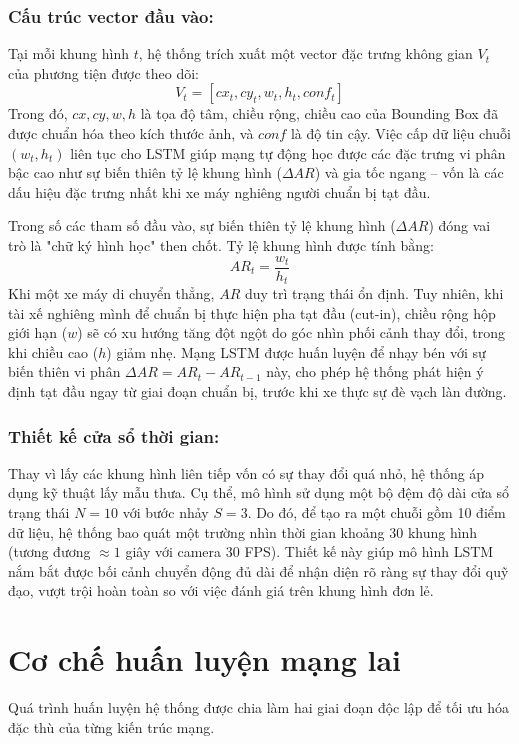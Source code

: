 	\subsubsection{Cấu trúc vector đầu vào:}
	Tại mỗi khung hình $t$, hệ thống trích xuất một vector đặc trưng không gian $V_t$ của phương tiện được theo dõi:
	\begin{equation}
		V_t = [cx_t, cy_t, w_t, h_t, conf_t]
	\end{equation}
	Trong đó, $cx, cy, w, h$ là tọa độ tâm, chiều rộng, chiều cao của Bounding Box đã được chuẩn hóa theo kích thước ảnh, và $conf$ là độ tin cậy. Việc cấp dữ liệu chuỗi $(w_t, h_t)$ liên tục cho LSTM giúp mạng tự động học được các đặc trưng vi phân bậc cao như sự biến thiên tỷ lệ khung hình ($\Delta AR$) và gia tốc ngang -- vốn là các dấu hiệu đặc trưng nhất khi xe máy nghiêng người chuẩn bị tạt đầu.
	
	Trong số các tham số đầu vào, sự biến thiên tỷ lệ khung hình ($\Delta AR$) đóng vai trò là "chữ ký hình học" then chốt. Tỷ lệ khung hình được tính bằng:
	\begin{equation}
    	AR_t = \frac{w_t}{h_t}
	\end{equation}
	Khi một xe máy di chuyển thẳng, $AR$ duy trì trạng thái ổn định. Tuy nhiên, khi tài xế nghiêng mình để chuẩn bị thực hiện pha tạt đầu (cut-in), chiều rộng hộp giới hạn ($w$) sẽ có xu hướng tăng đột ngột do góc nhìn phối cảnh thay đổi, trong khi chiều cao ($h$) giảm nhẹ. Mạng LSTM được huấn luyện để nhạy bén với sự biến thiên vi phân $\Delta AR = AR_t - AR_{t-1}$ này, cho phép hệ thống phát hiện ý định tạt đầu ngay từ giai đoạn chuẩn bị, trước khi xe thực sự đè vạch làn đường.

	\subsubsection{Thiết kế cửa sổ thời gian:}
	Thay vì lấy các khung hình liên tiếp vốn có sự thay đổi quá nhỏ, hệ thống áp dụng kỹ thuật lấy mẫu thưa. Cụ thể, mô hình sử dụng một bộ đệm độ dài cửa sổ trạng thái $N=10$ với bước nhảy $S=3$. Do đó, để tạo ra một chuỗi gồm 10 điểm dữ liệu, hệ thống bao quát một trường nhìn thời gian khoảng 30 khung hình (tương đương $\approx 1$ giây với camera 30 FPS). Thiết kế này giúp mô hình LSTM nắm bắt được bối cảnh chuyển động đủ dài để nhận diện rõ ràng sự thay đổi quỹ đạo, vượt trội hoàn toàn so với việc đánh giá trên khung hình đơn lẻ.
	
	\section{Cơ chế huấn luyện mạng lai}
	Quá trình huấn luyện hệ thống được chia làm hai giai đoạn độc lập để tối ưu hóa đặc thù của từng kiến trúc mạng.
	
